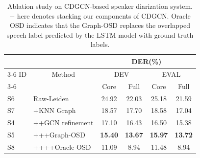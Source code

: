 \documentclass[10pt]{article}
\begin{document}
\begin{table}[]
\centering

\caption{Ablation study on CDGCN-based speaker diarization system. + here denotes stacking our components of CDGCN. Oracle OSD indicates that the Graph-OSD replaces the overlapped speech label predicted by the LSTM model with ground truth labels.}
\label{tab:ablation}
\begin{tabular}{llcccc}
\hline
   & \multicolumn{1}{c}{}       & \multicolumn{4}{c}{DER(\%)}                                       \\ \cline{3-6} 
ID & \multicolumn{1}{c}{Method} & \multicolumn{2}{c}{DEV}         & \multicolumn{2}{c}{EVAL}        \\ \cline{3-6} 
   & \multicolumn{1}{c}{}       & Core           & Full           & Core           & Full           \\ \hline
S6 & Raw-Leiden                     & 24.92          & 22.03          & 25.18          & 21.59          \\
S7 & +KNN Graph                 & 18.57          & 17.70          & 18.58          & 17.04          \\
S4 & ++GCN refinement           & 17.10          & 16.43          & 16.50          & 15.38          \\
S5 & +++Graph-OSD         & \textbf{15.40} & \textbf{13.67} & \textbf{15.97} & \textbf{13.72} \\ \hline
S8 & ++++Oracle OSD             & 11.09          & 8.94           & 11.48          & 8.94           \\ \hline
\end{tabular}
\vspace{-0.5cm}
\end{table}

\vspace{-0.2cm}
\end{document}
